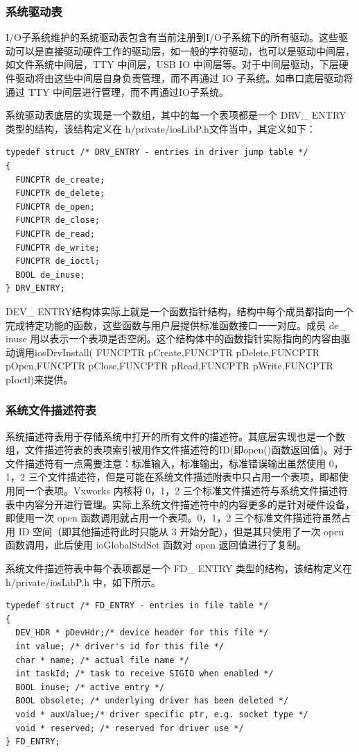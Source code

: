 \subsubsection{系统驱动表}	
	I/O子系统维护的系统驱动表包含有当前注册到I/O子系统下的所有驱动。这些驱动可以是直接驱动硬件工作的驱动层，如一般的字符驱动，也可以是驱动中间层，如文件系统中间层，TTY 中间层，USB IO 中间层等。对于中间层驱动，下层硬件驱动将由这些中间层自身负责管理，而不再通过 IO 子系统。如串口底层驱动将通过 TTY 中间层进行管理，而不再通过IO子系统。
	
	系统驱动表底层的实现是一个数组，其中的每一个表项都是一个 DRV\_ ENTRY 类型的结构，该结构定义在 h/private/iosLibP.h文件当中，其定义如下：
\lstset{language=C}
\begin{lstlisting}
typedef struct /* DRV_ENTRY - entries in driver jump table */ 
{ 
  FUNCPTR de_create; 
  FUNCPTR de_delete; 
  FUNCPTR de_open; 
  FUNCPTR de_close; 
  FUNCPTR de_read; 
  FUNCPTR de_write; 
  FUNCPTR de_ioctl; 
  BOOL de_inuse; 
} DRV_ENTRY; 
\end{lstlisting}
DEV\_ ENTRY结构体实际上就是一个函数指针结构，结构中每个成员都指向一个完成特定功能的函数，这些函数与用户层提供标准函数接口一一对应。成员 de\_ inuse 用以表示一个表项是否空闲。这个结构体中的函数指针实际指向的内容由驱动调用iosDrvInstall( FUNCPTR pCreate,FUNCPTR pDelete,FUNCPTR pOpen,FUNCPTR pClose,FUNCPTR pRead,FUNCPTR pWrite,FUNCPTR pIoctl)来提供。 


\subsubsection{系统文件描述符表}
	系统描述符表用于存储系统中打开的所有文件的描述符。其底层实现也是一个数组，文件描述符表的表项索引被用作文件描述符的ID(即open()函数返回值)。对于文件描述符有一点需要注意：标准输入，标准输出，标准错误输出虽然使用 0，1，2 三个文件描述符，但是可能在系统文件描述附表中只占用一个表项，即都使用同一个表项。Vxworks 内核将 0，1，2 三个标准文件描述符与系统文件描述符表中内容分开进行管理。实际上系统文件描述符中的内容更多的是针对硬件设备，即使用一次 open 函数调用就占用一个表项。0，1，2 三个标准文件描述符虽然占用 ID 空间（即其他描述符此时只能从 3 开始分配），但是其只使用了一次 open 函数调用，此后使用 ioGlobalStdSet 函数对 open 返回值进行了复制。

系统文件描述符表中每个表项都是一个 FD\_ ENTRY 类型的结构，该结构定义在h/private/iosLibP.h 中，如下所示。
\lstset{language=C}
\begin{lstlisting}
typedef struct /* FD_ENTRY - entries in file table */ 
{ 
  DEV_HDR * pDevHdr;/* device header for this file */ 
  int value; /* driver's id for this file */ 
  char * name; /* actual file name */ 
  int taskId; /* task to receive SIGIO when enabled */ 
  BOOL inuse; /* active entry */ 
  BOOL obsolete; /* underlying driver has been deleted */ 
  void * auxValue;/* driver specific ptr, e.g. socket type */ 
  void * reserved; /* reserved for driver use */ 
} FD_ENTRY; 
\end{lstlisting}

